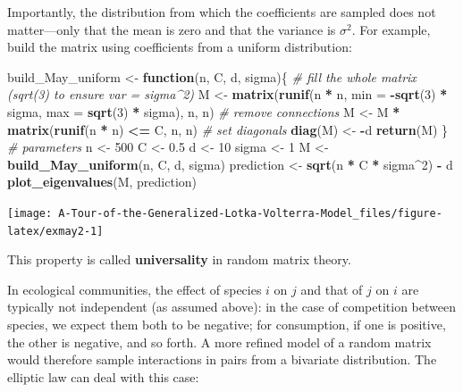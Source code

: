 \documentclass[]{book}
\newenvironment{Shaded}{\begin{snugshade}}{\end{snugshade}}
\newcommand{\CommentTok}[1]{\textcolor[rgb]{0.56,0.35,0.01}{\textit{#1}}}
\newcommand{\ControlFlowTok}[1]{\textcolor[rgb]{0.13,0.29,0.53}{\textbf{#1}}}
\newcommand{\DataTypeTok}[1]{\textcolor[rgb]{0.13,0.29,0.53}{#1}}
\newcommand{\DecValTok}[1]{\textcolor[rgb]{0.00,0.00,0.81}{#1}}
\newcommand{\FloatTok}[1]{\textcolor[rgb]{0.00,0.00,0.81}{#1}}
\newcommand{\KeywordTok}[1]{\textcolor[rgb]{0.13,0.29,0.53}{\textbf{#1}}}
\newcommand{\NormalTok}[1]{#1}
\newcommand{\OperatorTok}[1]{\textcolor[rgb]{0.81,0.36,0.00}{\textbf{#1}}}
\newcommand{\StringTok}[1]{\textcolor[rgb]{0.31,0.60,0.02}{#1}}
\begin{document}
Importantly, the distribution from which the coefficients are sampled does not matter---only that the mean is zero and that the variance is \(\sigma^2\). For example, build the matrix using coefficients from a uniform distribution:

\begin{Shaded}
\begin{Highlighting}[]
\NormalTok{build_May_uniform <-}\StringTok{ }\ControlFlowTok{function}\NormalTok{(n, C, d, sigma)\{}
  \CommentTok{# fill the whole matrix (sqrt(3) to ensure var = sigma^2)}
\NormalTok{  M <-}\StringTok{ }\KeywordTok{matrix}\NormalTok{(}\KeywordTok{runif}\NormalTok{(n }\OperatorTok{*}\StringTok{ }\NormalTok{n, }\DataTypeTok{min =} \OperatorTok{-}\KeywordTok{sqrt}\NormalTok{(}\DecValTok{3}\NormalTok{) }\OperatorTok{*}\StringTok{ }\NormalTok{sigma, }\DataTypeTok{max =} \KeywordTok{sqrt}\NormalTok{(}\DecValTok{3}\NormalTok{) }\OperatorTok{*}\StringTok{ }\NormalTok{sigma), n, n)}
  \CommentTok{# remove connections }
\NormalTok{  M <-}\StringTok{ }\NormalTok{M }\OperatorTok{*}\StringTok{ }\KeywordTok{matrix}\NormalTok{(}\KeywordTok{runif}\NormalTok{(n }\OperatorTok{*}\StringTok{ }\NormalTok{n) }\OperatorTok{<=}\StringTok{ }\NormalTok{C, n, n)}
  \CommentTok{# set diagonals}
  \KeywordTok{diag}\NormalTok{(M) <-}\StringTok{ }\OperatorTok{-}\NormalTok{d}
  \KeywordTok{return}\NormalTok{(M)}
\NormalTok{\}}
\CommentTok{# parameters}
\NormalTok{n <-}\StringTok{ }\DecValTok{500}
\NormalTok{C <-}\StringTok{ }\FloatTok{0.5}
\NormalTok{d <-}\StringTok{ }\DecValTok{10}
\NormalTok{sigma <-}\StringTok{ }\DecValTok{1}
\NormalTok{M <-}\StringTok{ }\KeywordTok{build_May_uniform}\NormalTok{(n, C, d, sigma)}
\NormalTok{prediction <-}\StringTok{ }\KeywordTok{sqrt}\NormalTok{(n }\OperatorTok{*}\StringTok{ }\NormalTok{C }\OperatorTok{*}\StringTok{ }\NormalTok{sigma}\OperatorTok{^}\DecValTok{2}\NormalTok{) }\OperatorTok{-}\StringTok{ }\NormalTok{d}
\KeywordTok{plot_eigenvalues}\NormalTok{(M, prediction)}
\end{Highlighting}
\end{Shaded}

\begin{center}\texttt{[image: A-Tour-of-the-Generalized-Lotka-Volterra-Model\_files/figure-latex/exmay2-1]} \end{center}

This property is called \textbf{universality} in random matrix theory.

In ecological communities, the effect of species \(i\) on \(j\) and that of \(j\) on \(i\) are typically not independent (as assumed above): in the case of competition between species, we expect them both to be negative; for consumption, if one is positive, the other is negative, and so forth. A more refined model of a random matrix would therefore sample interactions in pairs from a bivariate distribution. The elliptic law can deal with this case:
\end{document}
